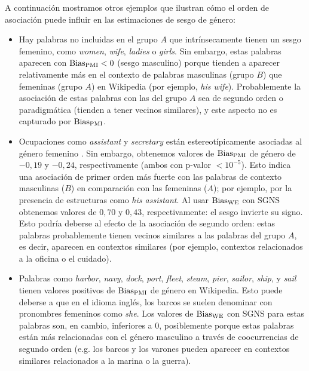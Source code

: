 A continuación mostramos otros ejemplos que ilustran cómo el orden de asociación puede influir en las estimaciones de sesgo de género:

\begin{itemize}

    \item Hay palabras no incluidas en el grupo $A$ que intrínsecamente tienen un sesgo femenino, como \emph{women}, \emph{wife}, \emph{ladies} o \emph{girls}. Sin embargo, estas palabras aparecen con $\operatorname{Bias_{PMI}} < 0$ (sesgo masculino) porque tienden a aparecer relativamente más en el contexto de palabras masculinas (grupo $B$) que femeninas (grupo $A$) en Wikipedia (por ejemplo, \emph{his wife}). Probablemente la asociación de estas palabras con las del grupo $A$ sea de segundo orden o paradigmática (tienden a tener vecinos similares), y este aspecto no es capturado por $\operatorname{Bias_{PMI}}$.
    
    \item Ocupaciones como \emph{assistant} y \emph{secretary} están estereotípicamente asociadas al género femenino \citep{caliskan2017semantics}. Sin embargo, obtenemos valores de $\operatorname{Bias_{PMI}}$ de género de $-0,19$ y $-0,24$,  respectivamente (ambos con p-valor $< 10^{-5}$). Esto indica una asociación de primer orden más fuerte con las palabras de contexto masculinas ($B$) en comparación con las femeninas ($A$); por ejemplo, por la presencia de estructuras como \emph{his assistant}. Al usar $\operatorname{Bias_{WE}}$ con SGNS obtenemos valores de $0,70$ y $0,43$, respectivamente: el sesgo invierte su signo. Esto podría deberse al efecto de la asociación de segundo orden: estas palabras probablemente tienen vecinos similares a las palabras del grupo $A$, es decir, aparecen en contextos similares (por ejemplo, contextos relacionados a la oficina o el cuidado).
    
    \item Palabras como \emph{harbor}, \emph{navy}, \emph{dock}, \emph{port}, \emph{fleet}, \emph{steam}, \emph{pier}, \emph{sailor}, \emph{ship}, y \emph{sail} tienen valores positivos de $\operatorname{Bias_{PMI}}$ de género en Wikipedia. Esto puede deberse a que en el idioma inglés, los barcos se suelen denominar con pronombres femeninos como \emph{she}. Los valores de $\operatorname{Bias_{WE}}$ con SGNS para estas palabras son, en cambio, inferiores a 0, posiblemente porque estas palabras están más relacionadas con el género masculino a través de coocurrencias de segundo orden (e.g. los barcos y los varones pueden aparecer en contextos similares relacionados a la marina o la guerra).

\end{itemize}


